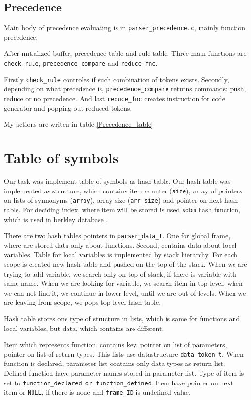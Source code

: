 \documentclass[11pt]{article}
\begin{document}
\subsection{Precedence}
Main body of precedence evaluating is in \texttt{parser\_precedence.c}, mainly function precedence.

After initialized buffer, precedence table and rule table. Three main functions are \texttt{check\_rule}, \texttt{precedence\_compare} and \texttt{reduce\_fnc}. 

Firstly \texttt{check\_rule} controles if such combination of tokens exists. Secondly, depending on what precedence is, \texttt{precedence\_compare} returns commands: push, reduce or no precedence. And last \texttt{reduce\_fnc} creates instruction for code generator and popping out reduced tokens.

My actions are writen in table \ref{Precedence_table}

\section{Table of symbols}
Our task was implement table of symbols as hash table. Our hash table was implemented as structure, which contains item counter (\texttt{size}), array of pointers on lists of synnonyms (\texttt{array}),
array size (\texttt{arr\_size}) and pointer on next hash table. For deciding index, where item will be stored is used \texttt{sdbm} hash function, which is used in berkley database \cite{hash_function}. 

There are two hash tables pointers in \texttt{parser\_data\_t}. One for global frame, where are stored data only about functions. Second, contains data about local variables. Table for local variables is implemented by
stack hierarchy. For each scope is created new hash table and pushed on the top of the stack. When we are trying to add variable, we search only on top of stack, if there is variable with same name. When we are looking for variable, we search item in top level, 
when we can not find it, we continue in lower level, until we are out of levels. When we are leaving from scope, we pops top level hash table.

Hash table stores one type of structure in lists, which is same for functions and local variables, but data, which contains are different.

Item which represents function, contains key, pointer on list of parameters, pointer on list of return types. This lists use datastructure \texttt{data\_token\_t}. When function
is declared, parameter list contains only data types as return list. Defined function have parameter names stored in parameter list. Type of item is set to \texttt{function\_declared or function\_defined}.
Item have pointer on next item or \texttt{NULL}, if there is none and \texttt{frame\_ID} is undefined value.
\end{document}
